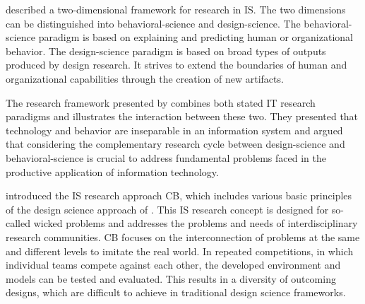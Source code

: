  described a two-dimensional framework for research in IS.
The two dimensions can be distinguished into behavioral-science and design-science. The behavioral-science
paradigm is based on explaining and predicting human or organizational behavior. The design-science
paradigm is based on broad types of outputs produced by design research. It strives to extend the boundaries
of human and organizational capabilities through the creation of new artifacts.

The research framework presented by  combines both stated
IT research paradigms and illustrates the interaction between these two.
They presented that technology and behavior are inseparable in an information system and 
argued that considering the complementary research cycle between design-science and behavioral-science
is crucial to address fundamental problems faced in the productive application of information technology.

 introduced the IS research approach CB,
which includes various basic principles of the design science approach of .
This IS research concept is designed for so-called wicked problems and addresses the problems and needs of interdisciplinary
research communities. CB focuses on the interconnection of problems at the same and different levels to imitate the real world.
In repeated competitions, in which individual teams compete against each other, the developed environment and models
can be tested and evaluated. This results in a diversity of outcoming designs, which are difficult to achieve in
traditional design science frameworks.

\clearpage